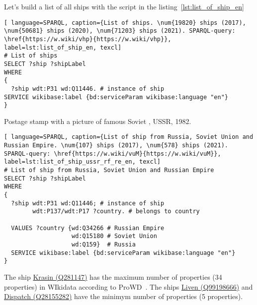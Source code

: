 Let's build a list of all ships with the script in the listing~\ref{lst:list_of_ship_en}


\begin{lstlisting}[ language=SPARQL, caption={List of ships. \num{19820} ships (2017), \num{50681} ships (2020), \num{71203} ships (2021). SPARQL-query: \href{https://w.wiki/vhp}{https://w.wiki/vhp}}, label=lst:list_of_ship_en, texcl]
# List of ships
SELECT ?ship ?shipLabel
WHERE
{
  ?ship wdt:P31 wd:Q11446. # instance of ship
SERVICE wikibase:label {bd:serviceParam wikibase:language "en"}
}
\end{lstlisting}


\begin{marginfigure}[0.0cm]
  {
    \setlength{\fboxsep}{0pt}%
    \setlength{\fboxrule}{1pt}%
  }
  \caption[Soviet destroyer project 7]{Postage stamp with a picture of famous Soviet , USSR, 1982.}%
  \label{fig:quiz_question_ship}%
\end{marginfigure}
  
\begin{lstlisting}[ language=SPARQL, caption={List of ship from Russia, Soviet Union and Russian Empire. \num{107} ships (2017), \num{578} ships (2021). SPARQL-query: \href{https://w.wiki/vuM}{https://w.wiki/vuM}}, label=lst:list_of_ship_ussr_rf_re_en, texcl]
# List of ship from Russia, Soviet Union and Russian Empire
SELECT ?ship ?shipLabel
WHERE
{
  ?ship wdt:P31 wd:Q11446; # instance of ship
        wdt:P137/wdt:P17 ?country. # belongs to country
    
  VALUES ?country {wd:Q34266 # Russian Empire
                   wd:Q15180 # Soviet Union
                   wd:Q159}  # Russia
  SERVICE wikibase:label {bd:serviceParam wikibase:language "en"}
}
\end{lstlisting}

\label{question:ship_1}

The ship \href{https://www.wikidata.org/wiki/Q281147}{Krasin (Q281147)} has the maximum number of properties (34 properties) in WIkidata according to ProWD~. The ships \href{https://www.wikidata.org/wiki/Q99198666}{Liven (Q99198666)} and \href{https://www.wikidata.org/wiki/Q28155282}{Dispatch (Q28155282)} have the minimym number of properties (5 properties).


